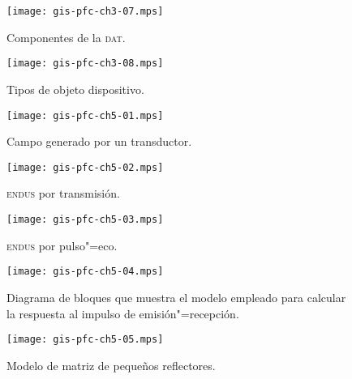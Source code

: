 \documentclass[a4paper,12pt]{article}
\begin{document}
\begin{figure}
	\begin{center}
		\texttt{[image: gis-pfc-ch3-07.mps]}
	\end{center}
	\caption[Componentes de la \textsc{dat}]{Componentes de la \textsc{dat}.}
	\label{fig:dat}
\end{figure}

\clearpage

\begin{figure}
	\begin{center}
		\texttt{[image: gis-pfc-ch3-08.mps]}
	\end{center}
	\caption[Tipos de objeto dispositivo]{Tipos de objeto dispositivo.}
	\label{fig:devobject}
\end{figure}

\begin{figure}
	\begin{center}
		\texttt{[image: gis-pfc-ch5-01.mps]}
	\end{center}
	\caption[Campo generado por un transductor]{Campo generado por un transductor.}
	\label{fig:field}
\end{figure}

\begin{figure}
	\begin{center}
		\texttt{[image: gis-pfc-ch5-02.mps]}
	\end{center}
	\caption[\textsc{endus} por transmisión]{\textsc{endus} por transmisión.}
	\label{fig:transmission}
\end{figure}

\begin{figure}
	\begin{center}
		\texttt{[image: gis-pfc-ch5-03.mps]}
	\end{center}
	\caption[\textsc{endus} por pulso"=eco]{\textsc{endus} por pulso"=eco.}
	\label{fig:echo}
\end{figure}

\clearpage

\begin{figure}
	\begin{center}
		\texttt{[image: gis-pfc-ch5-04.mps]}
	\end{center}
	\caption[Modelo de emisión"=transmisión]{Diagrama de bloques que muestra el modelo empleado para calcular la respuesta al impulso de emisión"=recepción.}
	\label{fig:model}
\end{figure}

\begin{figure}
	\begin{center}
		\texttt{[image: gis-pfc-ch5-05.mps]}
	\end{center}
	\caption[Modelo de matriz de pequeños reflectores]{Modelo de matriz de pequeños reflectores.}
	\label{fig:matrix}
\end{figure}
\end{document}
